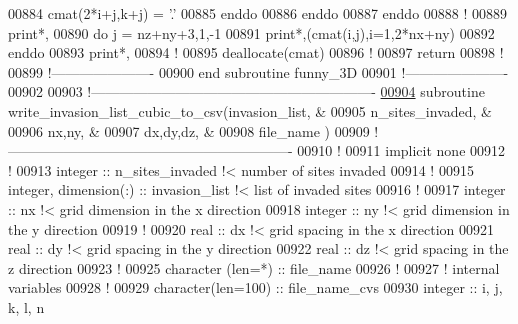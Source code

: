 \begin{DoxyCode}
00884          cmat(2*i+j,k+j) = \textcolor{stringliteral}{'.'}
00885       \textcolor{keyword}{enddo}
00886    \textcolor{keyword}{enddo}
00887 \textcolor{keyword}{enddo}
00888 \textcolor{comment}{!}
00889 print*,
00890 \textcolor{keyword}{do} j = nz+ny+3,1,-1
00891    print*,(cmat(i,j),i=1,2*nx+ny)
00892 \textcolor{keyword}{enddo}
00893 print*,
00894 \textcolor{comment}{!}
00895 \textcolor{keyword}{deallocate}(cmat)
00896 \textcolor{comment}{!}
00897 return
00898 \textcolor{comment}{!}
00899 \textcolor{comment}{!----------------------}
00900 \textcolor{keyword}{end subroutine funny\_3D}
00901 \textcolor{comment}{!----------------------}
00902 
00903 \textcolor{comment}{!-------------------------------------------------------------}
\hypertarget{module__write__output__files_8f90_source_l00904}{}\hyperlink{classmodule__write__output__files_abeb97fce277eb8861dd4991d980a3de4}{00904} \textcolor{keyword}{subroutine }write\_invasion\_list\_cubic\_to\_csv(invasion\_list,   &
00905                                             n\_sites\_invaded, &
00906                                             nx,ny,           &
00907                                             dx,dy,dz,        &
00908                                             file\_name        )        
00909 \textcolor{comment}{!-------------------------------------------------------------}
00910 \textcolor{comment}{!}
00911 \textcolor{keyword}{implicit none}
00912 \textcolor{comment}{!}
00913 \textcolor{keywordtype}{integer} :: n\_sites\_invaded \textcolor{comment}{!< number of sites invaded}
00914 \textcolor{comment}{!}
00915 \textcolor{keywordtype}{integer}, \textcolor{keywordtype}{dimension(:)} :: invasion\_list \textcolor{comment}{!< list of invaded sites}
00916 \textcolor{comment}{!}
00917 \textcolor{keywordtype}{integer} :: nx \textcolor{comment}{!< grid dimension in the x direction}
00918 \textcolor{keywordtype}{integer} :: ny \textcolor{comment}{!< grid dimension in the y direction }
00919 \textcolor{comment}{!}
00920 \textcolor{keywordtype}{real} :: dx \textcolor{comment}{!< grid spacing in the x direction}
00921 \textcolor{keywordtype}{real} :: dy \textcolor{comment}{!< grid spacing in the y direction}
00922 \textcolor{keywordtype}{real} :: dz \textcolor{comment}{!< grid spacing in the z direction}
00923 \textcolor{comment}{!}
00925 \textcolor{keywordtype}{character (len=*)} :: file\_name 
00926 \textcolor{comment}{!}
00927 \textcolor{comment}{! internal variables}
00928 \textcolor{comment}{!}
00929 \textcolor{keywordtype}{character(len=100)} :: file\_name\_cvs
00930 \textcolor{keywordtype}{integer} :: i, j, k, l, n

\end{DoxyCode}
